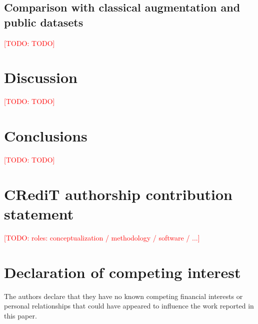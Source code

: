 \documentclass[preprint,12pt]{elsarticle}
\newcommand{\todo}[1]{\textcolor{red}{[TODO: #1]}}
\begin{document}
\subsection{Comparison with classical augmentation and public datasets}
\todo{TODO}

\section{Discussion}\label{sec:discussion}
\todo{TODO}

\section{Conclusions}\label{sec:conclusion}
\todo{TODO}

\section*{CRediT authorship contribution statement}
\todo{roles: conceptualization / methodology / software / ...}

\section*{Declaration of competing interest}
The authors declare that they have no known competing financial interests or
personal relationships that could have appeared to influence the work reported
in this paper.
\end{document}
